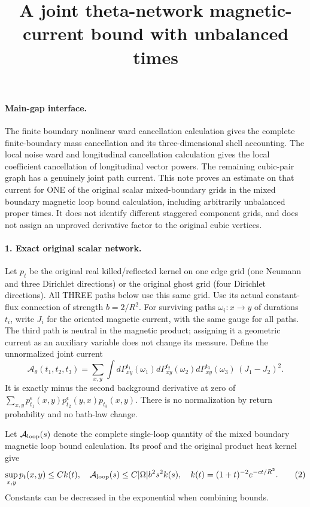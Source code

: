 \documentclass[11pt]{article}
\title{A joint theta-network magnetic-current bound with unbalanced times}\author{}\date{}
\begin{document}
\maketitle
\paragraph{Main-gap interface.}
The finite boundary nonlinear ward cancellation calculation gives the complete finite-boundary mass cancellation
and its three-dimensional shell accounting. The local noise ward and longitudinal cancellation calculation gives the local
coefficient cancellation of longitudinal vector powers. The remaining
cubic-pair graph has a genuinely joint path current. This note proves an
estimate on that current for ONE of the original scalar mixed-boundary
grids in the mixed boundary magnetic loop bound calculation, including arbitrarily unbalanced proper times. It does
not identify different staggered component grids, and does not assign an
unproved derivative factor to the original cubic vertices.

\paragraph{1. Exact original scalar network.}
Let $p_t$ be the original real killed/reflected kernel on one edge grid
(one Neumann and three Dirichlet directions) or the original ghost grid
(four Dirichlet directions). All THREE paths below use this same grid.
Use its actual constant-flux connection of strength $b=2/R^2$. For
surviving paths $\omega_i:x\to y$ of durations $t_i$, write $J_i$ for
the oriented magnetic current, with the same gauge for all paths.
The third path is neutral in the magnetic product; assigning it a
geometric current as an auxiliary variable does not change its measure.
Define the unnormalized joint current
\[
 \mathcal A_\theta(t_1,t_2,t_3)=
 \sum_{x,y}\int dP^{t_1}_{xy}(\omega_1)dP^{t_2}_{xy}(\omega_2)
                  dP^{t_3}_{xy}(\omega_3)\,(J_1-J_2)^2 .           \tag{1}
\]
It is exactly minus the second background derivative at zero of
$\sum_{x,y}p_{t_1}^{\epsilon}(x,y)
 p_{t_2}^{\epsilon}(y,x)p_{t_3}(x,y)$.
There is no normalization by return probability and no bath-law change.

Let $\mathcal A_{\rm loop}(s)$ denote the complete single-loop quantity
of the mixed boundary magnetic loop bound calculation. Its proof and the original product heat kernel give
\[
 \sup_{x,y}p_t(x,y)\le C k(t),\quad
 \mathcal A_{\rm loop}(s)\le C|\Omega|b^2 s^2 k(s),\quad
 k(t)=(1+t)^{-2}e^{-ct/R^2}.                                      \tag{2}
\]
Constants can be decreased in the exponential when combining bounds.
\end{document}
